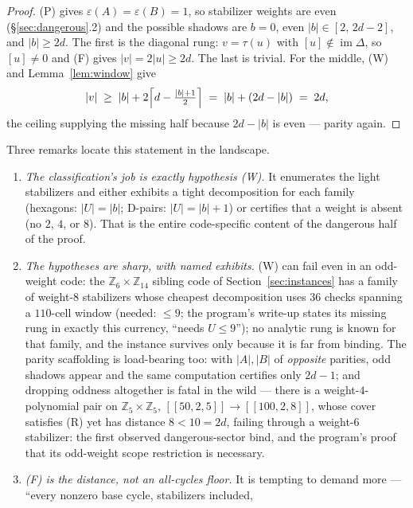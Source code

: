 \documentclass[11pt]{article}
\theoremstyle{plain}
\theoremstyle{definition}
\theoremstyle{remark}
\newcommand{\Z}{\mathbb{Z}}
\newcommand{\imD}{\operatorname{im}\Delta}
\newcommand{\wt}[1]{\lvert #1\rvert}
\begin{document}
\begin{proof}
(P) gives $\varepsilon(A) = \varepsilon(B) = 1$, so stabilizer weights are
even (\S\ref{sec:dangerous}.2) and the possible shadows are $b = 0$, even
$\wt{b} \in [2,\, 2d{-}2]$, and $\wt{b} \geq 2d$. The first is the diagonal
rung: $v = \tau(u)$ with $[u] \notin \imD$, so $[u] \neq 0$ and (F) gives
$\wt{v} = 2\wt{u} \geq 2d$. The last is trivial. For the middle, (W) and
Lemma~\ref{lem:window} give
\[
\wt{v} \;\geq\; \wt{b} +
2\Bigl\lceil d - \tfrac{\wt{b}+1}{2} \Bigr\rceil
\;=\; \wt{b} + (2d - \wt{b}) \;=\; 2d ,
\]
the ceiling supplying the missing half because $2d - \wt{b}$ is even ---
parity again.
\end{proof}

Three remarks locate this statement in the landscape.

\begin{enumerate}[leftmargin=2.2em]
\item \emph{The classification's job is exactly hypothesis (W).} It
  enumerates the light stabilizers and either exhibits a tight
  decomposition for each family (hexagons: $|U| = \wt{b}$; D-pairs:
  $|U| = \wt{b} + 1$) or certifies that a weight is absent (no $2$, $4$,
  or $8$). That is the entire code-specific content of the dangerous half
  of the proof.
\item \emph{The hypotheses are sharp, with named exhibits.} (W) can fail
  even in an odd-weight code: the $\Z_6 \times \Z_{14}$ sibling code of
  Section~\ref{sec:instances} has a family of weight-8 stabilizers whose
  cheapest decomposition uses $36$ checks spanning a $110$-cell window
  (needed: $\leq 9$; the program's write-up states its missing rung in
  exactly this currency, ``needs $U \leq 9$''); no analytic rung is known
  for that family, and the instance survives only because it is far from
  binding. The parity scaffolding is load-bearing too: with $\wt{A},
  \wt{B}$ of \emph{opposite} parities, odd shadows appear and the same
  computation certifies only $2d - 1$; and dropping oddness altogether is
  fatal in the wild --- there is a weight-$4$-polynomial pair on
  $\Z_5 \times \Z_5$, $[[50,2,5]] \to [[100,2,8]]$, whose cover satisfies
  (R) yet has distance $8 < 10 = 2d$, failing through a weight-6
  stabilizer: the first observed dangerous-sector bind, and the program's
  proof that its odd-weight scope restriction is necessary.
\item \emph{(F) is the distance, not an all-cycles floor.} It is tempting
  to demand more --- ``every nonzero base cycle, stabilizers included,

\end{enumerate}
\end{document}
